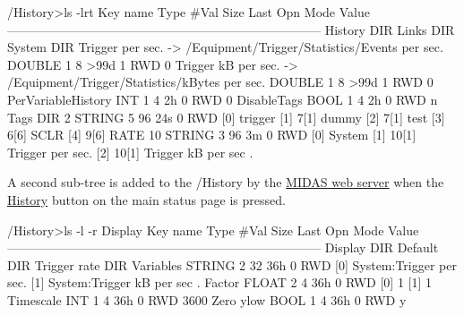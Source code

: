 \begin{DoxyCode}
/History>ls -lrt
Key name                        Type    #Val  Size  Last Opn Mode Value
---------------------------------------------------------------------------
History                         DIR
    Links                       DIR
        System                  DIR
            Trigger per sec. -> /Equipment/Trigger/Statistics/Events per sec.
                                DOUBLE  1     8     >99d 1   RWD  0
            Trigger kB per sec. -> /Equipment/Trigger/Statistics/kBytes per sec.
                                DOUBLE  1     8     >99d 1   RWD  0
    PerVariableHistory          INT     1     4     2h   0   RWD  0
    DisableTags                 BOOL    1     4     2h   0   RWD  n
    Tags                        DIR
        2                       STRING  5     96    24s  0   RWD
                                        [0]             trigger
                                        [1]             7[1] dummy
                                        [2]             7[1] test
                                        [3]             6[6] SCLR
                                        [4]             9[6] RATE
        10                      STRING  3     96    3m   0   RWD
                                        [0]             System
                                        [1]             10[1] Trigger per sec.
                                        [2]             10[1] Trigger kB per sec 
                                        .
\end{DoxyCode}


A second sub-\/tree is added to the /History by the \hyperlink{RC_mhttpd_utility}{MIDAS web server} when the \hyperlink{RC_mhttpd_History_page}{History} button on the main status page is pressed.


\begin{DoxyCode}
/History>ls -l -r Display
Key name                        Type    #Val  Size  Last Opn Mode Value
---------------------------------------------------------------------------
Display                         DIR
  Default                       DIR
    Trigger rate                DIR
        Variables               STRING  2     32    36h  0   RWD
                                        [0]             System:Trigger per sec.
                                        [1]             System:Trigger kB per sec
      .
        Factor                  FLOAT   2     4     36h  0   RWD
                                        [0]             1
                                        [1]             1
        Timescale               INT     1     4     36h  0   RWD  3600
        Zero ylow               BOOL    1     4     36h  0   RWD  y
\end{DoxyCode}


